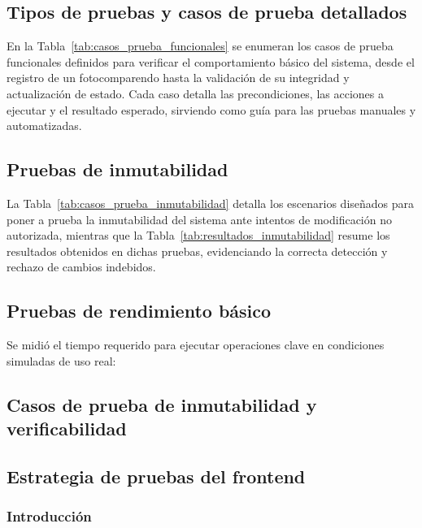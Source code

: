 \subsection{Tipos de pruebas y casos de prueba detallados}



\noindent En la Tabla~\ref{tab:casos_prueba_funcionales} se enumeran los casos de prueba funcionales definidos para verificar el comportamiento básico del sistema, desde el registro de un fotocomparendo hasta la validación de su integridad y actualización de estado. Cada caso detalla las precondiciones, las acciones a ejecutar y el resultado esperado, sirviendo como guía para las pruebas manuales y automatizadas.

\subsection{Pruebas de inmutabilidad}



\noindent La Tabla~\ref{tab:casos_prueba_inmutabilidad} detalla los escenarios diseñados para poner a prueba la inmutabilidad del sistema ante intentos de modificación no autorizada, mientras que la Tabla~\ref{tab:resultados_inmutabilidad} resume los resultados obtenidos en dichas pruebas, evidenciando la correcta detección y rechazo de cambios indebidos.

\subsection{Pruebas de rendimiento básico}
Se midió el tiempo requerido para ejecutar operaciones clave en condiciones simuladas de uso real:



\subsection{Casos de prueba de inmutabilidad y verificabilidad}



\subsection{Estrategia de pruebas del frontend}

\subsubsection{Introducción}

